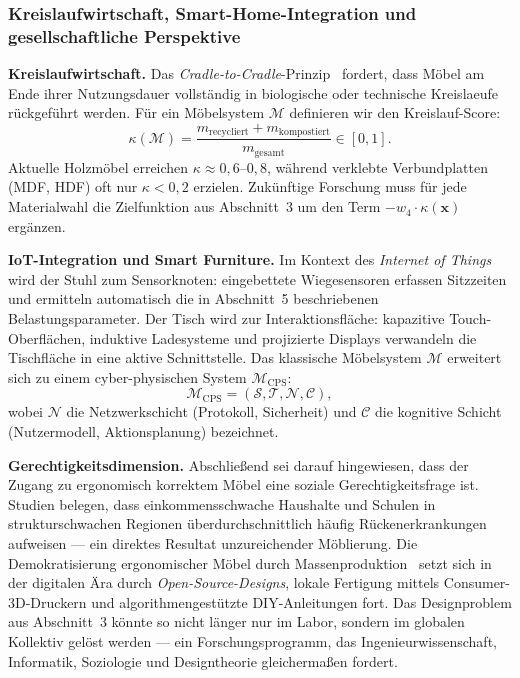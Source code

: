 ﻿\documentclass[a4paper,12pt]{article}
\theoremstyle{definition}
\begin{document}
\subsubsection{Kreislaufwirtschaft, Smart-Home-Integration und gesellschaftliche Perspektive}

\textbf{Kreislaufwirtschaft.}
Das \emph{Cradle-to-Cradle}-Prinzip~\cite{McDonoughBraungart2002} fordert, dass M\"{o}bel am Ende ihrer Nutzungsdauer
vollst\"{a}ndig in biologische oder technische Kreislaeufe r\"{u}ckgef\"{u}hrt werden.
F\"{u}r ein M\"{o}belsystem $\mathcal{M}$ definieren wir den Kreislauf-Score:
\[
	\kappa(\mathcal{M}) = \frac{m_{\mathrm{recycliert}} + m_{\mathrm{kompostiert}}}{m_{\mathrm{gesamt}}} \in [0, 1].
\]
Aktuelle Holzm\"{o}bel erreichen $\kappa \approx 0{,}6$--$0{,}8$, w\"{a}hrend
verklebte Verbundplatten (MDF, HDF) oft nur $\kappa < 0{,}2$ erzielen.
Zuk\"{u}nftige Forschung muss f\"{u}r jede Materialwahl die Zielfunktion aus
Abschnitt~3 um den Term $-w_4 \cdot \kappa(\mathbf{x})$ erg\"{a}nzen.

\textbf{IoT-Integration und Smart Furniture.}
Im Kontext des \emph{Internet of Things} wird der Stuhl zum Sensorknoten:
eingebettete Wiegesensoren erfassen Sitzzeiten und ermitteln automatisch
die in Abschnitt~5 beschriebenen Belastungsparameter.
Der Tisch wird zur Interaktionsfl\"{a}che: kapazitive Touch-Oberfl\"{a}chen,
induktive Ladesysteme und projizierte Displays verwandeln die Tischfl\"{a}che
in eine aktive Schnittstelle. Das klassische M\"{o}belsystem $\mathcal{M}$
erweitert sich zu einem cyber-physischen System $\mathcal{M}_{\mathrm{CPS}}$:
\[
	\mathcal{M}_{\mathrm{CPS}} = (\mathcal{S}, \mathcal{T}, \mathcal{N}, \mathcal{C}),
\]
wobei $\mathcal{N}$ die Netzwerkschicht (Protokoll, Sicherheit) und
$\mathcal{C}$ die kognitive Schicht (Nutzermodell, Aktionsplanung) bezeichnet.

\textbf{Gerechtigkeitsdimension.}
Abschlie\ss{}end sei darauf hingewiesen, dass der Zugang zu ergonomisch korrektem
M\"{o}bel eine soziale Gerechtigkeitsfrage ist. Studien belegen, dass
einkommensschwache Haushalte und Schulen in strukturschwachen Regionen
\"{u}berdurchschnittlich h\"{a}ufig R\"{u}ckenerkrankungen aufweisen --- ein direktes
Resultat unzureichender M\"{o}blierung.
Die Demokratisierung ergonomischer M\"{o}bel durch Massenproduktion~\cite{VegesackThonet1996}
setzt sich in der digitalen \"{A}ra durch \emph{Open-Source-Designs}, lokale Fertigung
mittels Consumer-3D-Druckern und algorithmengest\"{u}tzte DIY-Anleitungen fort.
Das Designproblem aus Abschnitt~3 k\"{o}nnte so nicht l\"{a}nger nur im Labor, sondern
im globalen Kollektiv gel\"{o}st werden --- ein Forschungsprogramm, das Ingenieurwissenschaft,
Informatik, Soziologie und Designtheorie gleicherma\ss{}en fordert.
\end{document}
